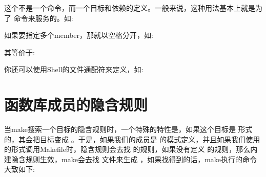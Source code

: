 \documentclass[a4paper,10pt]{sphinxmanual}
\begin{document}
这个不是一个命令，而一个目标和依赖的定义。一般来说，这种用法基本上就是为了
 命令来服务的。如:

\begin{sphinxVerbatim}[commandchars=\\\{\}]
  
       
\end{sphinxVerbatim}

如果要指定多个member，那就以空格分开，如:

\begin{sphinxVerbatim}[commandchars=\\\{\}]
 
\end{sphinxVerbatim}

其等价于:

\begin{sphinxVerbatim}[commandchars=\\\{\}]
 
\end{sphinxVerbatim}

你还可以使用Shell的文件通配符来定义，如:

\begin{sphinxVerbatim}[commandchars=\\\{\}]
\end{sphinxVerbatim}


\section{函数库成员的隐含规则}
\label{\detokenize{archives:id2}}
当make搜索一个目标的隐含规则时，一个特殊的特性是，如果这个目标是   形式的，其会把目标变成  。于是，如果我们的成员是  的模式定义，并且如果我们使用  的形式调用Makefile时，隐含规则会去找  的规则，如果没有定义  的规则，那么内建隐含规则生效，make会去找 
文件来生成  ，如果找得到的话，make执行的命令大致如下:
\end{document}
